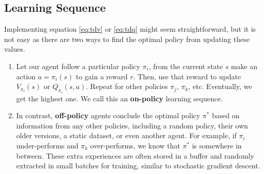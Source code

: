\documentclass[../main.tex]{subfiles}
\begin{document}
\subsection{Learning Sequence}
Implementing equation \ref{eq:tdv} or \ref{eq:tdq} might seem straightforward, but it is not easy as there are two ways to find the optimal policy from updating these values.
\begin{enumerate}
    \item Let our agent follow a particular policy $\pi_i$, from the current state $s$ make an action $a = \pi_i(s)$ to gain a reward $r$. Then, use that reward to update $V_{\pi_i}(s)$ or $Q_{\pi_i}(s, a)$. Repeat for other policies $\pi_j$, $\pi_k$, etc. Eventually, we get the highest one. We call this an \textbf{on-policy} learning sequence.
    \item In contrast, \textbf{off-policy} agents conclude the optimal policy $\pi^*$ based on information from any other policies, including a random policy, their own older versions, a static dataset, or even another agent. For example, if $\pi_i$ under-performs and $\pi_k$ over-performs, we know that $\pi^*$ is somewhere in between. These extra experiences are often stored in a buffer and randomly extracted in small batches for training, similar to stochastic gradient descent.
\end{enumerate}
\end{document}
